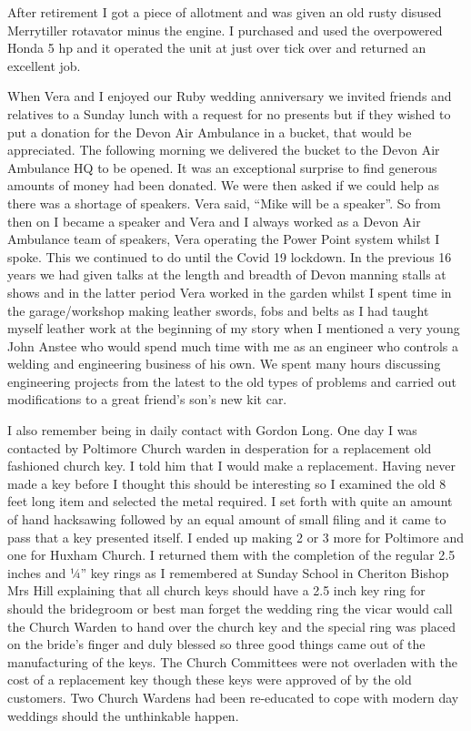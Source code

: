 After retirement I got a piece of allotment and was given an old rusty disused
Merrytiller rotavator minus the engine. I purchased and used the overpowered
Honda 5 hp and it operated the unit at just over tick over and returned an
excellent job.

When Vera and I enjoyed our Ruby wedding anniversary we invited friends and
relatives to a Sunday lunch with a request for no presents but if they wished
to put a donation for the Devon Air Ambulance in a bucket, that would be
appreciated. The following morning we delivered the bucket  to the Devon Air
Ambulance HQ to be opened. It was an exceptional surprise to find generous
amounts of money had been donated. We were then asked if we could help as
there was a shortage of speakers. Vera said, ``Mike will be a speaker''. So
from then on I became a speaker and Vera and I always worked as a Devon Air
Ambulance team of speakers, Vera operating the Power Point system whilst I
spoke. This we continued to do until the Covid 19 lockdown. In the previous
16 years we had given talks at the length and breadth of Devon manning stalls
at shows and in the latter period Vera worked in the garden whilst I spent time
in the garage/workshop making leather swords, fobs and belts as I had taught
myself leather work at the beginning of my story when I mentioned a very young
John Anstee who would spend much time with me as an engineer who controls a
welding and engineering business of his own. We spent many hours discussing
engineering projects from the latest to the old types of problems and carried
out modifications to a great friend's son's new kit car.

I also remember being in daily contact with Gordon Long. One day I was
contacted by Poltimore Church warden in desperation for a replacement old
fashioned church key. I told him that I would make a replacement. Having
never made a key before I thought this should be interesting so I examined the
old 8 feet long item and selected the metal required. I set forth with quite
an amount of hand hacksawing followed by an equal amount of small filing and it
came to pass that a key presented itself. I ended up making 2 or 3 more for
Poltimore and one for Huxham Church. I returned them with the completion of
the regular 2.5 inches and ¼'' key rings as I remembered at Sunday School in
Cheriton Bishop Mrs Hill explaining that all church keys should have a 2.5 inch
key ring for should the bridegroom or best man forget the wedding ring the
vicar would call the Church Warden to hand over the church key and the special
ring was placed on the bride's finger and duly blessed so three good things
came out of the manufacturing of the keys. The Church Committees were not
overladen with the cost of a replacement key though these keys were approved of
by the old customers. Two Church Wardens had been re-educated to cope with
modern day weddings should the unthinkable happen.

